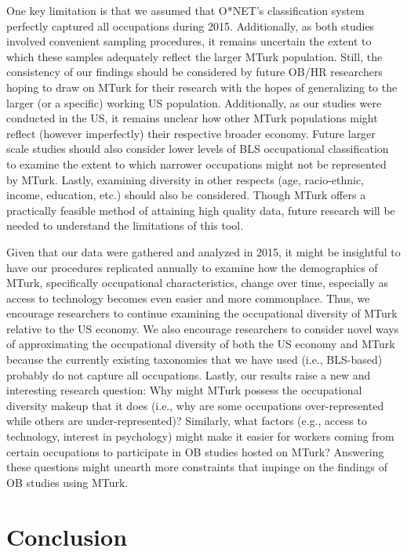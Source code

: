 \documentclass[english,man]{apa6}
\theoremstyle{definition}
\theoremstyle{definition}
\theoremstyle{remark}
\begin{document}
One key limitation is that we assumed that O*NET's classification system
perfectly captured all occupations during 2015. Additionally, as both
studies involved convenient sampling procedures, it remains uncertain
the extent to which these samples adequately reflect the larger MTurk
population. Still, the consistency of our findings should be considered
by future OB/HR researchers hoping to draw on MTurk for their research
with the hopes of generalizing to the larger (or a specific) working US
population. Additionally, as our studies were conducted in the US, it
remains unclear how other MTurk populations might reflect (however
imperfectly) their respective broader economy. Future larger scale
studies should also consider lower levels of BLS occupational
classification to examine the extent to which narrower occupations might
not be represented by MTurk. Lastly, examining diversity in other
respects (age, racio-ethnic, income, education, etc.) should also be
considered. Though MTurk offers a practically feasible method of
attaining high quality data, future research will be needed to
understand the limitations of this tool.

Given that our data were gathered and analyzed in 2015, it might be
insightful to have our procedures replicated annually to examine how the
demographics of MTurk, specifically occupational characteristics, change
over time, especially as access to technology becomes even easier and
more commonplace. Thus, we encourage researchers to continue examining
the occupational diversity of MTurk relative to the US economy. We also
encourage researchers to consider novel ways of approximating the
occupational diversity of both the US economy and MTurk because the
currently existing taxonomies that we have used (i.e., BLS-based)
probably do not capture all occupations. Lastly, our results raise a new
and interesting research question: Why might MTurk possess the
occupational diversity makeup that it does (i.e., why are some
occupations over-represented while others are under-represented)?
Similarly, what factors (e.g., access to technology, interest in
psychology) might make it easier for workers coming from certain
occupations to participate in OB studies hosted on MTurk? Answering
these questions might unearth more constraints that impinge on the
findings of OB studies using MTurk.

\section{Conclusion}\label{conclusion}
\end{document}
